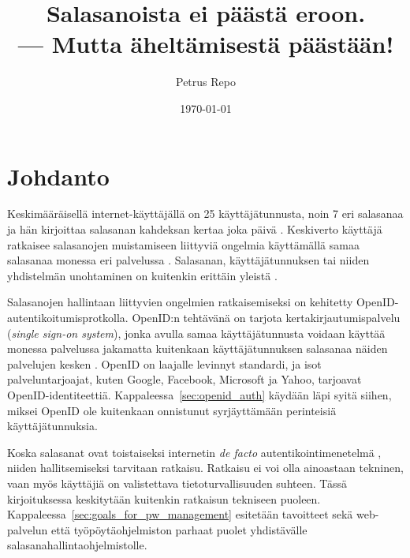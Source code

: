 \documentclass{tktltiki}
\begin{document}
\title{Salasanoista ei päästä eroon.\\ --- Mutta äheltämisestä päästään!}
\author{Petrus Repo}
\date{\today}
\maketitle


\onehalfspacing

\subject{Tietojenkäsittelytiede}

\keywords{}

\begin{abstract}

\end{abstract}

\setcounter{tocdepth}{3}
\mytableofcontents


\section{Johdanto}

Keskimääräisellä internet-käyttäjällä on 25 käyttäjätunnusta, noin 7 eri salasanaa ja hän kirjoittaa salasanan kahdeksan kertaa joka päivä \cite{study_of_passwords_07}. Keskiverto käyttäjä ratkaisee salasanojen muistamiseen liittyviä ongelmia käyttämällä samaa salasanaa monessa eri palvelussa \cite{password_management_strategies_06}. Salasanan, käyttäjätunnuksen tai niiden yhdistelmän unohtaminen on kuitenkin erittäin yleistä \cite{will_we_ever_escape_passwords_05}.

Salasanojen hallintaan liittyvien ongelmien ratkaisemiseksi on kehitetty OpenID-autentikoitumisprotkolla. OpenID:n tehtävänä on tarjota kertakirjautumispalvelu (\emph{single sign-on system}), jonka avulla samaa käyttäjätunnusta voidaan käyttää monessa palvelussa jakamatta kuitenkaan käyttäjätunnuksen salasanaa näiden palvelujen kesken \cite{openid_2.0_platform_2009}. OpenID on laajalle levinnyt standardi, ja isot palveluntarjoajat, kuten Google, Facebook, Microsoft ja Yahoo, tarjoavat OpenID-identiteettiä. Kappaleessa~\ref{sec:openid_auth} käydään läpi syitä siihen, miksei OpenID ole kuitenkaan onnistunut syrjäyttämään perinteisiä käyttäjätunnuksia.

Koska salasanat ovat toistaiseksi internetin \emph{de facto} autentikointimenetelmä \cite{study_of_passwords_07, passpet_06, password_management_strategies_06, pwdhash_extension_05}, niiden hallitsemiseksi tarvitaan ratkaisu. Ratkaisu ei voi olla ainoastaan tekninen, vaan myös käyttäjiä on valistettava tietoturvallisuuden suhteen. Tässä kirjoituksessa keskitytään kuitenkin ratkaisun tekniseen puoleen. Kappaleessa~\ref{sec:goals_for_pw_management} esitetään tavoitteet sekä web-palvelun että työpöytäohjelmiston parhaat puolet yhdistävälle salasanahallintaohjelmistolle.
\end{document}
